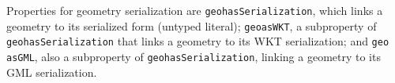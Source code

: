 Properties for geometry serialization are \texttt{\gls{geo}hasSerialization}, which links a geometry to its serialized form (untyped literal); \texttt{\gls{geo}asWKT}, a subproperty of \texttt{\gls{geo}hasSerialization} that links a geometry to its WKT serialization; and \texttt{\gls{geo}\\asGML}, also a subproperty of \texttt{\gls{geo}hasSerialization}, linking a geometry to its GML serialization.







